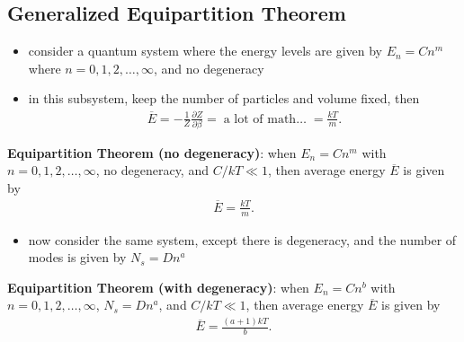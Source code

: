 \documentclass[10pt]{article}
\begin{document}
\subsection{Generalized Equipartition Theorem}
\begin{itemize}
    \item consider a quantum system where the energy levels are given by $E_n = Cn^m$ where $n=0,1,2,\ldots,\infty$, and no degeneracy 
    \item in this subsystem, keep the number of particles and volume fixed, then 
        \begin{gather*}
            \overline{E} = -\frac{1}{Z} \frac{\partial Z}{\partial \beta} = \; \text{a lot of math\ldots} \; = \frac{kT}{m}
        .\end{gather*}
\end{itemize}
\begin{theorem}
    \textbf{Equipartition Theorem (no degeneracy)}: when $E_n = Cn^m$ with  $n=0,1,2,\ldots,\infty$, no degeneracy, and $C / kT \ll 1$, then average energy $\overline{E}$ is given by 
    \begin{gather*}
        \overline{E} = \frac{kT}{m}
    .\end{gather*}
\end{theorem}
\begin{itemize}
    \item now consider the same system, except there is degeneracy, and the number of modes is given by $N_s = Dn^a$
\end{itemize}
\begin{theorem}
    \textbf{Equipartition Theorem (with degeneracy)}: when $E_n = Cn^b$ with  $n=0,1,2,\ldots,\infty$, $N_s = Dn^a$, and $C / kT \ll 1$, then average energy $\overline{E}$ is given by 
    \begin{gather*}
        \overline{E} = \frac{(a+1)kT}{b}
    .\end{gather*}
\end{theorem}
\end{document}
